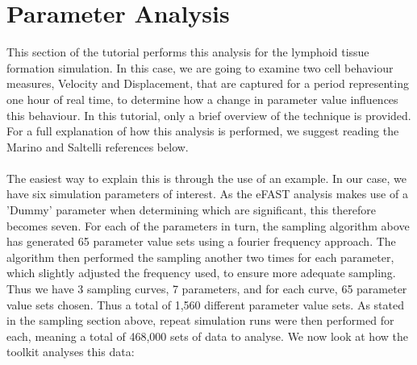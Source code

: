 \documentclass[a4paper,11pt]{article}
\begin{document}
\section{Parameter Analysis}
\noindent This section of the tutorial performs this analysis for the lymphoid tissue formation simulation.  In this case, we are going to examine two cell behaviour measures, Velocity and Displacement, that are captured for a period representing one hour of real time, to determine how a change in parameter value influences this behaviour. In this tutorial, only a brief overview of the technique is provided. For a full explanation of how this analysis is performed, we suggest reading the Marino and Saltelli references below. \\
\\
The easiest way to explain this is through the use of an example. In our case, we have six simulation parameters of interest. As the eFAST analysis makes use of a 'Dummy' parameter when determining which are significant, this therefore becomes seven. For each of the parameters in turn, the sampling algorithm above has generated 65 parameter value sets using a fourier frequency approach. The algorithm then performed the sampling another two times for each parameter, which slightly adjusted the frequency used, to ensure more adequate sampling.  Thus we have 3 sampling curves, 7 parameters, and for each curve, 65 parameter value sets chosen. Thus a total of 1,560 different parameter value sets. As stated in the sampling section above, repeat simulation runs were then performed for each, meaning a total of 468,000 sets of data to analyse. We now look at how the toolkit analyses this data:
\\
\end{document}
